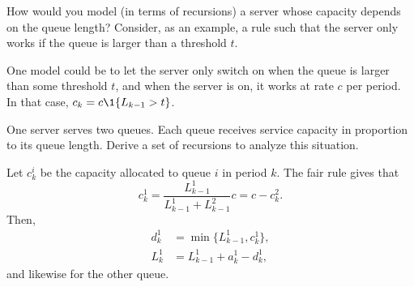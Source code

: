\begin{exercise}
  How would you model (in terms of recursions) a server whose capacity
  depends on the queue length? Consider, as an example, a rule such
  that the server only works if the queue is larger than a threshold $t$. 
  \begin{solution}
    One model could be to let the server only switch on when the queue
    is larger than some threshold $t$, and when the server is on, it
    works at rate $c$ per period. In that case,
    $c_k = c\1{L_{k-1} > t}$.
  \end{solution}
\end{exercise}

\begin{exercise} One server serves two queues. Each
  queue receives service capacity in proportion to its queue length. Derive a set of recursions to analyze this situation.
  \begin{solution}
    Let $c_k^i$ be the capacity allocated to queue $i$ in period $k$. The fair rule gives that 
    \begin{equation*}
      c_k^1 = \frac{L_{k-1}^1}{L_{k-1}^1 + L_{k-1}^2} c = c - c_k^2. 
    \end{equation*}
Then, 
\begin{equation*}
  \begin{split}
      d_k^1 &= \min\{L_{k-1}^1, c^1_k\}, \\
L_k^1 &= L_{k-1}^1+a_k^1  - d_k^1,
  \end{split}
\end{equation*}
and likewise for the other queue.
  \end{solution}
  \end{exercise}

